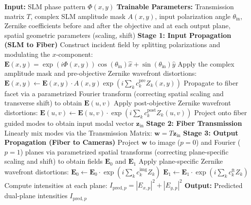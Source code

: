 \documentclass{article}
\begin{document}
\begin{algorithm*}[t]
\caption{Differentiable Forward Model with Aberration Corrections}
\label{alg:forward_model}
\begin{algorithmic}[1]
\State \textbf{Input:} SLM phase pattern $\Phi(x,y)$
\State \textbf{Trainable Parameters:} Transmission matrix $T$, complex SLM amplitude mask $A(x,y)$, input polarization angle $\theta_{\text{in}}$, Zernike coefficients before and after the objective and at each output plane, spatial geometric parameters (scaling, shift)
\State \textbf{Stage 1: Input Propagation (SLM to Fiber)}
\State \quad Construct incident field by splitting polarizations and modulating the $x$-component: 
\State \quad\quad $\mathbf{E}(x,y) = \exp(i \Phi(x,y)) \cos(\theta_{\text{in}})\hat{x} + \sin(\theta_{\text{in}})\hat{y}$
\State \quad Apply the complex amplitude mask and pre-objective Zernike wavefront distortions: 
\State \quad\quad $\mathbf{E}(x,y) \gets \mathbf{E}(x,y) \cdot A(x,y) \exp\left(i \sum_k c^{\text{pre}}_k Z_k(x,y)\right)$
\State \quad Propagate to fiber facet via a parametrized Fourier transform (correcting spatial scaling and transverse shift) to obtain $\mathbf{E}(u,v)$
\State \quad Apply post-objective Zernike wavefront distortions: 
\State \quad\quad $\mathbf{E}(u,v) \gets \mathbf{E}(u,v) \cdot \exp\left(i \sum_k c^{\text{post}}_k Z_k(u,v)\right)$
\State \quad Project onto fiber guided modes to obtain input modal vector $\mathbf{z}_{\text{in}}$
\State \textbf{Stage 2: Fiber Transmission}
\State \quad Linearly mix modes via the Transmission Matrix: $\mathbf{w} = T \mathbf{z}_{\text{in}}$
\State \textbf{Stage 3: Output Propagation (Fiber to Cameras)}
\State \quad Project $\mathbf{w}$ to image ($p=0$) and Fourier ($p=1$) planes via parametrized spatial transforms (correcting plane-specific scaling and shift) to obtain fields $\mathbf{E}_0$ and $\mathbf{E}_1$
\State \quad Apply plane-specific Zernike wavefront distortions: 
\State \quad\quad $\mathbf{E}_0 \gets \mathbf{E}_0 \cdot \exp\left(i \sum_k c^{\text{img}}_k Z_k\right)$
\State \quad\quad $\mathbf{E}_1 \gets \mathbf{E}_1 \cdot \exp\left(i \sum_k c^{\text{ft}}_k Z_k\right)$
\State \quad Compute intensities at each plane: $I_{\text{pred},p} = |E_{x,p}|^2 + |E_{y,p}|^2$
\State \textbf{Output:} Predicted dual-plane intensities $I_{\text{pred},p}$
\end{algorithmic}
\end{algorithm*}
\end{document}
